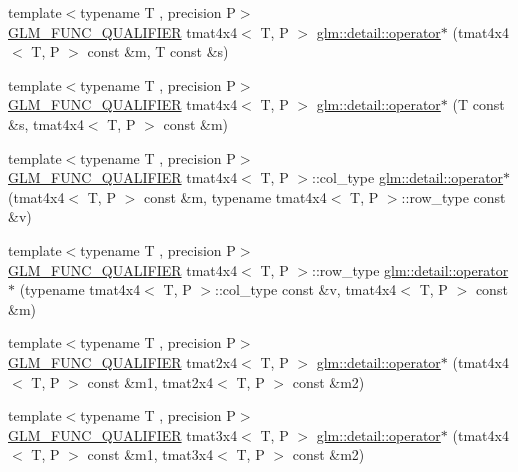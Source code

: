 \begin{DoxyCompactItemize}
\item 
{\footnotesize template$<$typename T , precision P$>$ }\\\hyperlink{setup_8hpp_a33fdea6f91c5f834105f7415e2a64407}{G\+L\+M\+\_\+\+F\+U\+N\+C\+\_\+\+Q\+U\+A\+L\+I\+F\+I\+ER} tmat4x4$<$ T, P $>$ \hyperlink{namespaceglm_1_1detail_aae5229ce4d28adf1f3052bb9cb71bd28}{glm\+::detail\+::operator$\ast$} (tmat4x4$<$ T, P $>$ const \&m, T const \&s)
\item 
{\footnotesize template$<$typename T , precision P$>$ }\\\hyperlink{setup_8hpp_a33fdea6f91c5f834105f7415e2a64407}{G\+L\+M\+\_\+\+F\+U\+N\+C\+\_\+\+Q\+U\+A\+L\+I\+F\+I\+ER} tmat4x4$<$ T, P $>$ \hyperlink{namespaceglm_1_1detail_a77c5733c23ddacefe7b69e2929b9bd44}{glm\+::detail\+::operator$\ast$} (T const \&s, tmat4x4$<$ T, P $>$ const \&m)
\item 
{\footnotesize template$<$typename T , precision P$>$ }\\\hyperlink{setup_8hpp_a33fdea6f91c5f834105f7415e2a64407}{G\+L\+M\+\_\+\+F\+U\+N\+C\+\_\+\+Q\+U\+A\+L\+I\+F\+I\+ER} tmat4x4$<$ T, P $>$\+::col\+\_\+type \hyperlink{namespaceglm_1_1detail_a55eb34fb079884a746e1bed10159b3a2}{glm\+::detail\+::operator$\ast$} (tmat4x4$<$ T, P $>$ const \&m, typename tmat4x4$<$ T, P $>$\+::row\+\_\+type const \&v)
\item 
{\footnotesize template$<$typename T , precision P$>$ }\\\hyperlink{setup_8hpp_a33fdea6f91c5f834105f7415e2a64407}{G\+L\+M\+\_\+\+F\+U\+N\+C\+\_\+\+Q\+U\+A\+L\+I\+F\+I\+ER} tmat4x4$<$ T, P $>$\+::row\+\_\+type \hyperlink{namespaceglm_1_1detail_af0a0c8131a854c3d7fde0e9a0881074d}{glm\+::detail\+::operator$\ast$} (typename tmat4x4$<$ T, P $>$\+::col\+\_\+type const \&v, tmat4x4$<$ T, P $>$ const \&m)
\item 
{\footnotesize template$<$typename T , precision P$>$ }\\\hyperlink{setup_8hpp_a33fdea6f91c5f834105f7415e2a64407}{G\+L\+M\+\_\+\+F\+U\+N\+C\+\_\+\+Q\+U\+A\+L\+I\+F\+I\+ER} tmat2x4$<$ T, P $>$ \hyperlink{namespaceglm_1_1detail_ad3ea815bb10c28b91ac9229641161316}{glm\+::detail\+::operator$\ast$} (tmat4x4$<$ T, P $>$ const \&m1, tmat2x4$<$ T, P $>$ const \&m2)
\item 
{\footnotesize template$<$typename T , precision P$>$ }\\\hyperlink{setup_8hpp_a33fdea6f91c5f834105f7415e2a64407}{G\+L\+M\+\_\+\+F\+U\+N\+C\+\_\+\+Q\+U\+A\+L\+I\+F\+I\+ER} tmat3x4$<$ T, P $>$ \hyperlink{namespaceglm_1_1detail_a2639ec7ab8cc1cae7fa66fbd376aafb6}{glm\+::detail\+::operator$\ast$} (tmat4x4$<$ T, P $>$ const \&m1, tmat3x4$<$ T, P $>$ const \&m2)

\end{DoxyCompactItemize}
